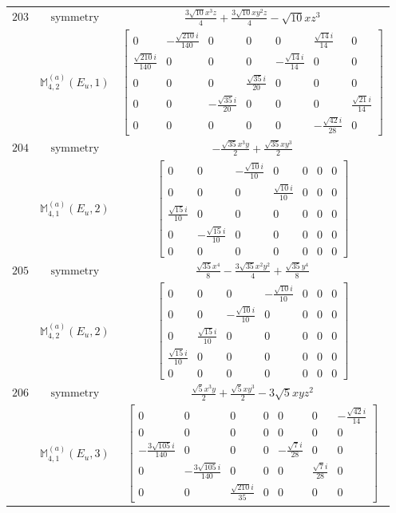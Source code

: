 \documentclass[fleqn,8pt,landscape]{jsarticle}
\begin{document}
\begin{longtable}{ccc}
$ 203 $ & $ \text{symmetry} $ & $ \frac{3 \sqrt{10} x^{3} z}{4} + \frac{3 \sqrt{10} x y^{2} z}{4} - \sqrt{10} x z^{3} $ \\
$  $ & $ \mathbb{M}_{4,2}^{(a)}(E_{u},1) $ & $ \begin{bmatrix} 0 & - \frac{\sqrt{210} i}{140} & 0 & 0 & 0 & \frac{\sqrt{14} i}{14} & 0 \\ \frac{\sqrt{210} i}{140} & 0 & 0 & 0 & - \frac{\sqrt{14} i}{14} & 0 & 0 \\ 0 & 0 & 0 & \frac{\sqrt{35} i}{20} & 0 & 0 & 0 \\ 0 & 0 & - \frac{\sqrt{35} i}{20} & 0 & 0 & 0 & \frac{\sqrt{21} i}{14} \\ 0 & 0 & 0 & 0 & 0 & - \frac{\sqrt{42} i}{28} & 0 \end{bmatrix} $ \\ \hline
$ 204 $ & $ \text{symmetry} $ & $ - \frac{\sqrt{35} x^{3} y}{2} + \frac{\sqrt{35} x y^{3}}{2} $ \\
$  $ & $ \mathbb{M}_{4,1}^{(a)}(E_{u},2) $ & $ \begin{bmatrix} 0 & 0 & - \frac{\sqrt{10} i}{10} & 0 & 0 & 0 & 0 \\ 0 & 0 & 0 & \frac{\sqrt{10} i}{10} & 0 & 0 & 0 \\ \frac{\sqrt{15} i}{10} & 0 & 0 & 0 & 0 & 0 & 0 \\ 0 & - \frac{\sqrt{15} i}{10} & 0 & 0 & 0 & 0 & 0 \\ 0 & 0 & 0 & 0 & 0 & 0 & 0 \end{bmatrix} $ \\ \hline
$ 205 $ & $ \text{symmetry} $ & $ \frac{\sqrt{35} x^{4}}{8} - \frac{3 \sqrt{35} x^{2} y^{2}}{4} + \frac{\sqrt{35} y^{4}}{8} $ \\
$  $ & $ \mathbb{M}_{4,2}^{(a)}(E_{u},2) $ & $ \begin{bmatrix} 0 & 0 & 0 & - \frac{\sqrt{10} i}{10} & 0 & 0 & 0 \\ 0 & 0 & - \frac{\sqrt{10} i}{10} & 0 & 0 & 0 & 0 \\ 0 & \frac{\sqrt{15} i}{10} & 0 & 0 & 0 & 0 & 0 \\ \frac{\sqrt{15} i}{10} & 0 & 0 & 0 & 0 & 0 & 0 \\ 0 & 0 & 0 & 0 & 0 & 0 & 0 \end{bmatrix} $ \\ \hline
$ 206 $ & $ \text{symmetry} $ & $ \frac{\sqrt{5} x^{3} y}{2} + \frac{\sqrt{5} x y^{3}}{2} - 3 \sqrt{5} x y z^{2} $ \\
$  $ & $ \mathbb{M}_{4,1}^{(a)}(E_{u},3) $ & $ \begin{bmatrix} 0 & 0 & 0 & 0 & 0 & 0 & - \frac{\sqrt{42} i}{14} \\ 0 & 0 & 0 & 0 & 0 & 0 & 0 \\ - \frac{3 \sqrt{105} i}{140} & 0 & 0 & 0 & - \frac{\sqrt{7} i}{28} & 0 & 0 \\ 0 & - \frac{3 \sqrt{105} i}{140} & 0 & 0 & 0 & \frac{\sqrt{7} i}{28} & 0 \\ 0 & 0 & \frac{\sqrt{210} i}{35} & 0 & 0 & 0 & 0 \end{bmatrix} $ \\ \hline

\end{longtable}
\end{document}

